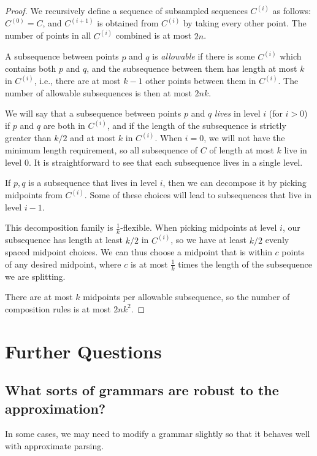 \documentclass{article}
\begin{document}
\begin{proof}
  We recursively define a sequence of subsampled sequences $C^{(i)}$ as
  follows: $C^{(0)} = C$, and $C^{(i+1)}$ is obtained from $C^{(i)}$
  by taking every other point. The number of points in all $C^{(i)}$
  combined is at most $2n$.

  A subsequence between points $p$ and $q$ is \emph{allowable} if
  there is some $C^{(i)}$ which contains both $p$ and $q$, and the
  subsequence between them has length at most $k$ in $C^{(i)}$, i.e.,
  there are at most $k-1$ other points between them in $C^{(i)}$. The
  number of allowable subsequences is then at most $2nk$.

  We will say that a subsequence between points $p$ and $q$
  \emph{lives} in level $i$ (for $i>0$) if $p$ and $q$ are both in
  $C^{(i)}$, and if the length of the subsequence is strictly greater
  than $k/2$ and at most $k$ in $C^{(i)}$. When $i=0$, we will not
  have the minimum length requirement, so all subsequence of $C$ of
  length at most $k$ live in level $0$. It is straightforward to see
  that each subsequence lives in a single level.

  If $p,q$ is a subsequence that lives in level $i$, then we can
  decompose it by picking midpoints from $C^{(i)}$. Some of these
  choices will lead to subsequences that live in level $i-1$.

  This decomposition family is $\frac{1}{k}$-flexible. When picking
  midpoints at level $i$, our subsequence has length at least $k/2$ in
  $C^{(i)}$, so we have at least $k/2$ evenly spaced midpoint
  choices. We can thus choose a midpoint that is within $c$ points of
  any desired midpoint, where $c$ is at most $\frac{1}{k}$ times the
  length of the subsequence we are splitting.
  
  There are at most $k$ midpoints per allowable subsequence, so the number
  of composition rules is at most $2nk^2$.
\end{proof}


\section{Further Questions}

\subsection{What sorts of grammars are robust to the approximation?}
In some cases, we may need to modify a grammar slightly so that it
behaves well with approximate parsing.
\end{document}
